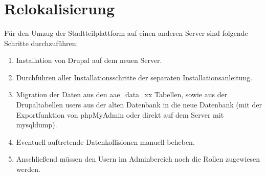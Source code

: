 \documentclass{swp}
\begin{document}
\\\\\\\\\\

\section{Relokalisierung}
F\"ur den Umzug der Stadtteilplattform auf einen anderen Server sind folgende Schritte durchzuf\"uhren:
\begin{enumerate}
\item Installation von Drupal auf dem neuen Server.
\item Durchf\"uhren aller Installationsschritte der separaten Installationsanleitung.
\item Migration der Daten aus den aae\_{}data\_{}xx Tabellen, sowie aus der Drupaltabellen users aus der alten Datenbank in die neue Datenbank (mit der Exportfunktion von phpMyAdmin oder direkt auf dem Server mit mysqldump).
\item Eventuell auftretende Datenkollisionen manuell beheben.
\item Anschlie{\ss}end m\"ussen den Usern im Adminbereich noch die Rollen zugewiesen werden.
\end{enumerate}
\end{document}
